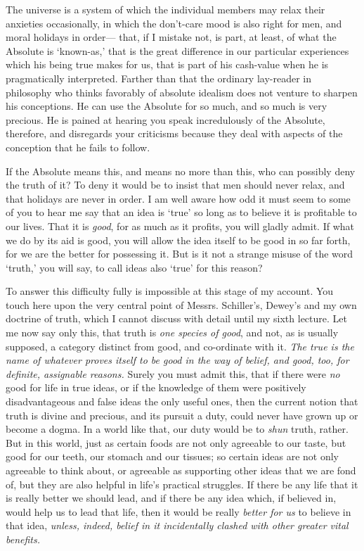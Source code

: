 \documentclass[]{article}
\begin{document}
The universe is a system of which the individual members may relax their
anxieties occasionally, in which the don't-care mood is also right for
men, and moral holidays in order--- that, if I mistake not, is part, at
least, of what the Absolute is `known-as,' that is the great difference
in our particular experiences which his being true makes for us, that
is part of his cash-value when he is pragmatically interpreted. Farther
than that the ordinary lay-reader in philosophy who thinks favorably of
absolute idealism does not venture to sharpen his conceptions. He can
use the Absolute for so much, and so much is very precious. He is pained
at hearing you speak incredulously of the Absolute, therefore, and
disregards your criticisms because they deal with aspects of the
conception that he fails to follow.

If the Absolute means this, and means no more than this, who can
possibly deny the truth of it? To deny it would be to insist that men
should never relax, and that holidays are never in order. I am well
aware how odd it must seem to some of you to hear me say that an idea is
`true' so long as to believe it is profitable to our lives. That it is
\emph{good}, for as much as it profits, you will gladly admit. If what we do
by its aid is good, you will allow the idea itself to be good in so far
forth, for we are the better for possessing it. But is it not a strange
misuse of the word `truth,' you will say, to call ideas also `true' for
this reason?

To answer this difficulty fully is impossible at this stage of
my account. You touch here upon the very central point of Messrs.
Schiller's, Dewey's and my own doctrine of truth, which I cannot discuss
with detail until my sixth lecture. Let me now say only this, that truth
is \emph{one species of good}, and not, as is usually supposed, a category
distinct from good, and co-ordinate with it. \emph{The true is the name of
whatever proves itself to be good in the way of belief, and good, too,
for definite, assignable reasons.} Surely you must admit this, that if
there were \emph{no} good for life in true ideas, or if the knowledge of them
were positively disadvantageous and false ideas the only useful ones,
then the current notion that truth is divine and precious, and its
pursuit a duty, could never have grown up or become a dogma. In a world
like that, our duty would be to \emph{shun} truth, rather. But in this world,
just as certain foods are not only agreeable to our taste, but good for
our teeth, our stomach and our tissues; so certain ideas are not only
agreeable to think about, or agreeable as supporting other ideas that we
are fond of, but they are also helpful in life's practical struggles. If
there be any life that it is really better we should lead, and if there
be any idea which, if believed in, would help us to lead that life,
then it would be really \emph{better for us} to believe in that idea, \emph{unless,
indeed, belief in it incidentally clashed with other greater vital
benefits.}
\end{document}
